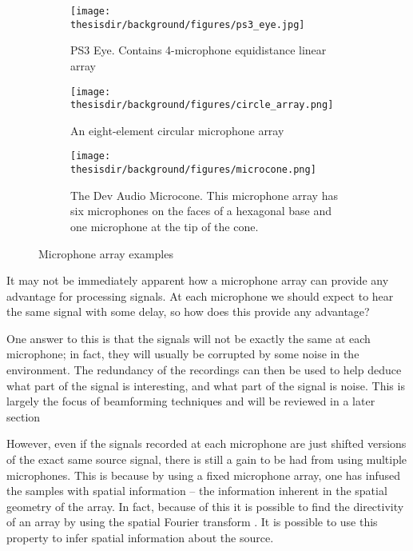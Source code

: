 \documentclass{uiucecethesis09}
\begin{document}
      \begin{figure}[b]
        \centering
        \begin{subfigure}[b]{.45\textwidth}
          \texttt{[image: \\thesisdir/background/figures/ps3\_eye.jpg]}
          \caption{PS3 Eye. Contains 4-microphone equidistance linear array}
          \label{fig:ps3_eye}
        \end{subfigure}
        \quad
        \begin{subfigure}[b]{.45\textwidth}
          \texttt{[image: \\thesisdir/background/figures/circle\_array.png]}
          \caption{ An eight-element circular microphone array 
            \cite{tashev2009sound}}
          \label{fig:circle_array}
        \end{subfigure}
        
        \begin{subfigure}[b]{\textwidth}
          \centering
          \texttt{[image: \\thesisdir/background/figures/microcone.png]}
          \caption{ The Dev Audio Microcone. This microphone array has six 
          microphones on the faces of a hexagonal base and one microphone at the 
        tip of the cone.}
          \label{fig:microcone}
        \end{subfigure}
        \caption{Microphone array examples}
        \label{fig:mic_array_examples}
      \end{figure}

      It may not be immediately apparent how a microphone array can provide any 
      advantage for processing signals. At each microphone we should expect to 
      hear the same signal with some delay, so how does this provide any 
      advantage?  
      
      One answer to this is that the signals will not be exactly the same at 
      each microphone; in fact, they will usually be corrupted by some noise in 
      the environment. The redundancy of the recordings can then be used to help 
      deduce what part of the signal is interesting, and what part of the signal 
      is noise. This is largely the focus of beamforming techniques and will be 
      reviewed in a later section
      
      However, even if the signals recorded at each microphone are just shifted 
      versions of the exact same source signal, there is still a gain to be had 
      from using multiple microphones. This is because by using a fixed 
      microphone array, one has infused the samples with spatial information -- 
      the information inherent in the spatial geometry of the array. In fact, 
      because of this it is possible to find the directivity of an array by 
      using the spatial Fourier transform \cite{benesty2010microphone}. It is 
      possible to use this property to infer spatial information about the 
      source.
\end{document}
